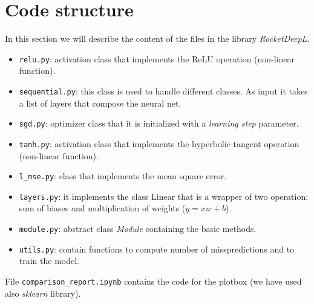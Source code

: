 \documentclass[journal, a4paper]{IEEEtran}
\begin{document}
\section{Code structure}
\label{sec:codestruc}
In this section we will describe the content of the files in the library \textit{RocketDeepL}.
\begin{itemize}
    \item \texttt{relu.py}: activation class that implements the ReLU operation (non-linear function).
    \item \texttt{sequential.py}: this class is used to handle different classes. As input it takes a list of layers that compose the neural net.
    \item \texttt{sgd.py}: optimizer class that it is initialized with a \textit{learning step} parameter.
    \item \texttt{tanh.py}: activation class that implements the hyperbolic tangent operation (non-linear function).
    \item \texttt{l\_mse.py}: class that implements the mean square error.
    \item \texttt{layers.py}: it implements the class Linear that is a wrapper of two operation: sum of biases and multiplication of weights ($y = xw + b$).
    \item \texttt{module.py}: abstract class \textit{Module} containing the basic methods.
    \item \texttt{utils.py}: contain functions to compute number of misspredictions and to train the model.
\end{itemize}
File \texttt{comparison\_report.ipynb} contains the code for the plotbox (we have used also \textit{sklearn} library). 
\end{document}
